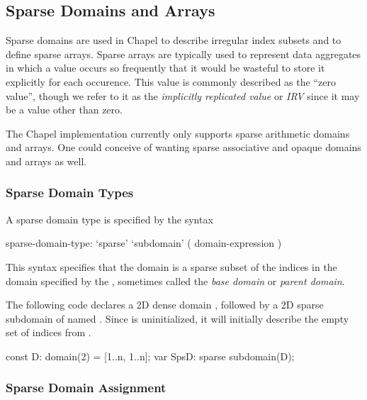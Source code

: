 \subsection{Sparse Domains and Arrays}
\label{Sparse_Domains_and_Arrays}

Sparse domains are used in Chapel to describe irregular index subsets
and to define sparse arrays.  Sparse arrays are typically used to
represent data aggregates in which a value occurs so frequently that
it would be wasteful to store it explicitly for each occurence.  This
value is commonly described as the ``zero value'', though we refer to
it as the \emph{implicitly replicated value} or \emph{IRV} since it
may be a value other than zero.

\begin{status}
The Chapel implementation currently only supports sparse arithmetic
domains and arrays.  One could conceive of wanting sparse associative
and opaque domains and arrays as well.
\end{status}

\subsubsection{Sparse Domain Types}

A sparse domain type is specified by the syntax
\begin{syntax}
sparse-domain-type:
  `sparse' `subdomain' ( domain-expression )
\end{syntax}
This syntax specifies that the domain is a sparse subset of the
indices in the domain specified by the ,
sometimes called the \emph{base domain} or \emph{parent domain}.

\begin{example}
The following code declares a 2D dense domain , followed by a
2D sparse subdomain of  named .  Since 
is uninitialized, it will initially describe the empty set of indices
from .
\begin{chapel}
const D: domain(2) = [1..n, 1..n];
var SpsD: sparse subdomain(D);
\end{chapel}
\end{example}


\subsubsection{Sparse Domain Assignment}

